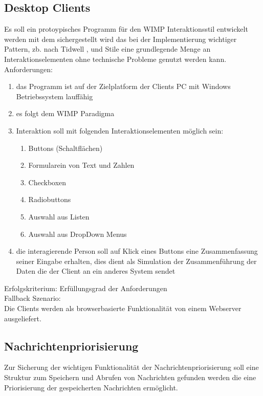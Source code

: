 \documentclass[11pt,oneside,a4paper,notitlepage]{article}
\begin{document}
\subsection{Desktop Clients}
%
Es soll ein protoypisches Programm für den WIMP Interaktionsstil entwickelt werden mit dem sichergestellt wird das bei der Implementierung wichtiger Pattern, zb. nach Tidwell \href{}{}, 
und Stile eine grundlegende Menge an Interaktionselementen ohne technische Probleme genutzt werden kann.
\\
Anforderungen:
\begin{enumerate}
\item das Programm ist auf der Zielplatform der Clients PC mit Windows Betriebssystem lauffähig
\item es folgt dem WIMP Paradigma
\item Interaktion soll mit folgenden Interaktionselementen möglich sein:
\begin{enumerate}
\item Buttons (Schaltflächen)
\item Formularein von Text und Zahlen 
\item Checkboxen
\item Radiobuttons
\item Auswahl aus Listen
\item Auswahl aus DropDown Menus
\end{enumerate}
\item die interagierende Person soll auf Klick eines Buttons eine Zusammenfassung seiner Eingabe erhalten, dies dient als Simulation der Zusammenführung der Daten die der Client an ein anderes System sendet
\end{enumerate}
\noindent
Erfolgskriterium: Erfüllungsgrad der Anforderungen\\
Fallback Szenario:\\
Die Clients werden als browserbasierte Funktionalität von einem Webserver ausgeliefert.
%
%
\subsection{Nachrichtenpriorisierung}
Zur Sicherung der wichtigen Funktionalität der Nachrichtenpriorisierung soll eine Struktur zum Speichern und Abrufen von Nachrichten gefunden werden die eine Priorisierung der gespeicherten Nachrichten ermöglicht.
\end{document}
